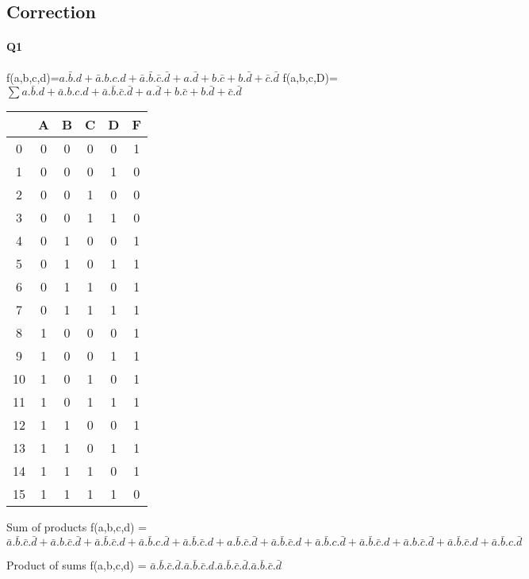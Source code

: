 \subsection{Correction}

\paragraph{Q1}

f(a,b,c,d)=$a.\bar b.d+\bar a.b.c.d+\bar a.\bar b.\bar c.\bar d + a.\bar d+b.\bar c+b.\bar d+\bar c.\bar d$
f(a,b,c,D)=$ \sum a.\bar b.d+\bar a.b.c.d+\bar a.\bar b.\bar c.\bar d + a.\bar d+b.\bar c+b.\bar d+\bar c.\bar d $ 

        \begin{tabular}{|c|c|c|c|c||c|}
    \toprule
         & A & B & C & D & F\\ \midrule0 & 0 & 0 & 0 & 0 & 1\\1 & 0 & 0 & 0 & 1 & 0\\2 & 0 & 0 & 1 & 0 & 0\\3 & 0 & 0 & 1 & 1 & 0\\\midrule4 & 0 & 1 & 0 & 0 & 1\\5 & 0 & 1 & 0 & 1 & 1\\6 & 0 & 1 & 1 & 0 & 1\\7 & 0 & 1 & 1 & 1 & 1\\\midrule8 & 1 & 0 & 0 & 0 & 1\\9 & 1 & 0 & 0 & 1 & 1\\10 & 1 & 0 & 1 & 0 & 1\\11 & 1 & 0 & 1 & 1 & 1\\\midrule12 & 1 & 1 & 0 & 0 & 1\\13 & 1 & 1 & 0 & 1 & 1\\14 & 1 & 1 & 1 & 0 & 1\\15 & 1 & 1 & 1 & 1 & 0\\\bottomrule
        \end{tabular}
        
Sum of products 
 f(a,b,c,d) = $\bar a.\bar b.\bar c.\bar d + \bar a.b.\bar c.\bar d + \bar a.\bar b.\bar c.d + \bar a.\bar b.c.\bar d + \bar a.\bar b.\bar c.d + a.\bar b.\bar c.\bar d + \bar a.\bar b.\bar c.d + \bar a.\bar b.c.\bar d + \bar a.\bar b.\bar c.d + \bar a.b.\bar c.\bar d + \bar a.\bar b.\bar c.d + \bar a.\bar b.c.\bar d$

Product of sums 
 f(a,b,c,d) = $\bar a.\bar b.\bar c.\bar d.\bar a.\bar b.\bar c.d.\bar a.\bar b.\bar c.\bar d.\bar a.\bar b.\bar c.\bar d$

